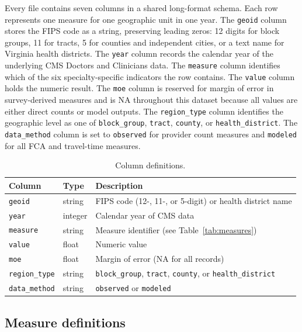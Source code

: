 \documentclass{CUP-JNL-DAP}%
\begin{document}
Every file contains seven columns in a shared long-format schema. Each row represents one measure for one geographic unit in one year. The \texttt{geoid} column stores the FIPS code as a string, preserving leading zeros: 12 digits for block groups, 11 for tracts, 5 for counties and independent cities, or a text name for Virginia health districts. The \texttt{year} column records the calendar year of the underlying CMS Doctors and Clinicians data. The \texttt{measure} column identifies which of the six specialty-specific indicators the row contains. The \texttt{value} column holds the numeric result. The \texttt{moe} column is reserved for margin of error in survey-derived measures and is NA throughout this dataset because all values are either direct counts or model outputs. The \texttt{region\_type} column identifies the geographic level as one of \texttt{block\_group}, \texttt{tract}, \texttt{county}, or \texttt{health\_district}. The \texttt{data\_method} column is set to \texttt{observed} for provider count measures and \texttt{modeled} for all FCA and travel-time measures.

\begin{table}[ht]
\centering
\caption{Column definitions.}
\label{tab:schema}
\small
\begin{tabularx}{\textwidth}{llX}
\toprule
Column & Type & Description \\
\midrule
\texttt{geoid} & string & FIPS code (12-, 11-, or 5-digit) or health district name \\
\texttt{year} & integer & Calendar year of CMS data \\
\texttt{measure} & string & Measure identifier (see Table~\ref{tab:measures}) \\
\texttt{value} & float & Numeric value \\
\texttt{moe} & float & Margin of error (NA for all records) \\
\texttt{region\_type} & string & \texttt{block\_group}, \texttt{tract}, \texttt{county}, or \texttt{health\_district} \\
\texttt{data\_method} & string & \texttt{observed} or \texttt{modeled} \\
\bottomrule
\end{tabularx}
\end{table}

\subsection{Measure definitions}
\end{document}
